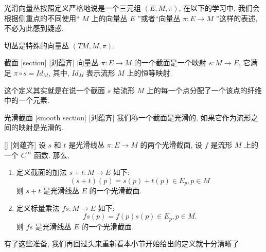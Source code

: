 \documentclass[UTF8]{ctexart}
\begin{document}
        \begin{rmk}
            []
            光滑向量丛按照定义严格地说是一个三元组 \((E,M,\pi)\), 在以下的学习中, 我们会根据侧重点的不同使用“ \(M\) 上的向量丛 \(E\) ”或者“向量丛 \(\pi: E \to M\) ”这样的表述, 不必为此感到疑惑. 
        \end{rmk}

        \begin{rmk}
            []
            切丛是特殊的向量丛 \((TM, M, \pi)\). 
        \end{rmk}

        \begin{dfn}
            []
            {截面}
            [section]
            [刘蕴齐]
            向量丛 \(\pi: E \to M\) 的一个截面是一个映射 \(s: M \to E\), 它满足 \(\pi \circ s = Id_{M}\), 其中,  \(Id_{M}\) 表示流形 \(M\) 上的恒等映射. 
        \end{dfn}

        \begin{rmk}
            []
            这个定义其实就是在说一个截面 \(s\) 给流形 \(M\) 上的每一个点分配了一个该点的纤维中的一个元素. 
        \end{rmk}

        \begin{dfn}
            []
            {光滑截面}
            [smooth section]
            [刘蕴齐]
            我们称一个截面是光滑的, 如果它作为流形之间的映射是光滑的. 
        \end{dfn}

        \begin{ppt}
            []
            {}
            []
            [刘蕴齐]
            设 \(s\) 和 \(t\) 是光滑线丛 \(\pi: E \to M\) 的两个光滑截面, 设 \(f\) 是流形 \(M\) 上的一个 \(C^{\infty}\) 函数. 那么,
            \begin{enumerate}
                \item 定义截面的加法 \(s + t: M \to E\) 如下:
                \[
                    (s + t)(p) = s(p) + t(p) \in E_p, p \in M
                \]
                则 \(s + t\) 是光滑线丛 \(E\) 的一个光滑截面. 
                \item 定义标量乘法 \(f s: M \to E\) 如下:
                \[
                    fs(p) = f(p)s(p) \in E_p, p \in M.
                \]
                则 \(f s\) 是光滑线丛 \(E\) 的一个光滑截面. 
            \end{enumerate}
        \end{ppt}
        有了这些准备, 我们再回过头来重新看本小节开始给出的定义就十分清晰了. 
\end{document}

